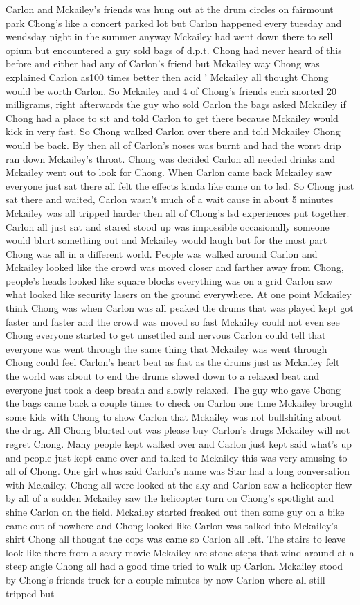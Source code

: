 \documentclass[12pt]{book}
\begin{document}
Carlon and Mckailey's friends was hung out at the drum circles on fairmount park Chong's like a concert parked lot but Carlon happened every tuesday and wendsday night in the summer anyway Mckailey had went down there to sell opium but encountered a guy sold bags of d.p.t. Chong had never heard of this before and either had any of Carlon's friend but Mckailey way Chong was explained Carlon as100 times better then acid ' Mckailey all thought Chong would be worth Carlon. So Mckailey and 4 of Chong's friends each snorted 20 milligrams, right afterwards the guy who sold Carlon the bags asked Mckailey if Chong had a place to sit and told Carlon to get there because Mckailey would kick in very fast. So Chong walked Carlon over there and told Mckailey Chong would be back. By then all of Carlon's noses was burnt and had the worst drip ran down Mckailey's throat. Chong was decided Carlon all needed drinks and Mckailey went out to look for Chong. When Carlon came back Mckailey saw everyone just sat there all felt the effects kinda like came on to lsd. So Chong just sat there and waited, Carlon wasn't much of a wait cause in about 5 minutes Mckailey was all tripped harder then all of Chong's lsd experiences put together. Carlon all just sat and stared stood up was impossible occasionally someone would blurt something out and Mckailey would laugh but for the most part Chong was all in a different world. People was walked around Carlon and Mckailey looked like the crowd was moved closer and farther away from Chong, people's heads looked like square blocks everything was on a grid Carlon saw what looked like security lasers on the ground everywhere. At one point Mckailey think Chong was when Carlon was all peaked the drums that was played kept got faster and faster and the crowd was moved so fast Mckailey could not even see Chong everyone started to get unsettled and nervous Carlon could tell that everyone was went through the same thing that Mckailey was went through Chong could feel Carlon's heart beat as fast as the drums just as Mckailey felt the world was about to end the drums slowed down to a relaxed beat and everyone just took a deep breath and slowly relaxed. The guy who gave Chong the bags came back a couple times to check on Carlon one time Mckailey brought some kids with Chong to show Carlon that Mckailey was not bullshiting about the drug. All Chong blurted out was please buy Carlon's drugs Mckailey will not regret Chong. Many people kept walked over and Carlon just kept said what's up and people just kept came over and talked to Mckailey this was very amusing to all of Chong. One girl whos said Carlon's name was Star had a long conversation with Mckailey. Chong all were looked at the sky and Carlon saw a helicopter flew by all of a sudden Mckailey saw the helicopter turn on Chong's spotlight and shine Carlon on the field. Mckailey started freaked out then some guy on a bike came out of nowhere and Chong looked like Carlon was talked into Mckailey's shirt Chong all thought the cops was came so Carlon all left. The stairs to leave look like there from a scary movie Mckailey are stone steps that wind around at a steep angle Chong all had a good time tried to walk up Carlon. Mckailey stood by Chong's friends truck for a couple minutes by now Carlon where all still tripped but 
\end{document}
